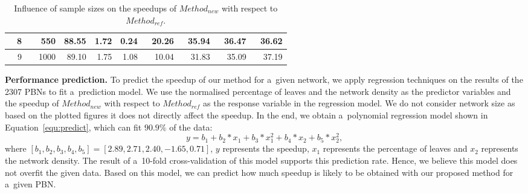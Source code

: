 \documentclass[runningheads,a4paper]{llncs}
\begin{document}
\begin{table}[!t]
\begin{tabular}{|r|r|r|r|r|r|r|r|r|}
8                                         & 550                                        & 88.55                                                                                             & 1.72                                          &                                  0.24                                                                    & 20.26                       & 35.94                        & 36.47                         & 36.62                         \\ \hline
~~9                      & ~~1000                                       & 89.10                                                                                             & 1.75                                          &                               1.08                                                                       & ~~10.04                       & ~~31.83                        &        ~~35.09                       & ~~37.19                         \\ \hline
\end{tabular}
\caption{Influence of sample sizes on the speedups of {\sf $Method_{new}$} with respect to {\sf
$Method_{ref}$}.}
\label{tab:influence}
\end{table}

\medskip\noindent\textbf{Performance prediction.}
To predict the speedup of our method for a~given network, we apply regression techniques on the
results of the 2307 PBNs to fit a~prediction model. We use the normalised percentage of leaves and
the network density as the predictor variables and the speedup of {\sf $Method_{new}$} with
respect to {\sf $Method_{ref}$} as the response variable in the regression model. We do not
consider network size as based on the plotted figures it does not directly affect the speedup. In
the end, we obtain a~polynomial regression model shown in Equation~\eqref{equ:predict}, which can
fit $90.9\%$ of the data:
\begin{equation}
y=b_1+b_2*x_1+b_3*x_1^2+b_4*x_2+b_5*x_2^2,
\label{equ:predict}
\end{equation}
where $[b_1,b_2,b_3,b_4,b_5]=[2.89, 2.71, 2.40, -1.65, 0.71]$, $y$ represents the speedup, $x_1$
represents the percentage of leaves and $x_2$ represents the network density. The result of
a~10-fold cross-validation of this model supports this prediction rate. Hence, we believe this
model does not overfit the given data. Based on this model, we can predict how much speedup is
likely to be obtained with our proposed method for a~given PBN.
\end{document}
